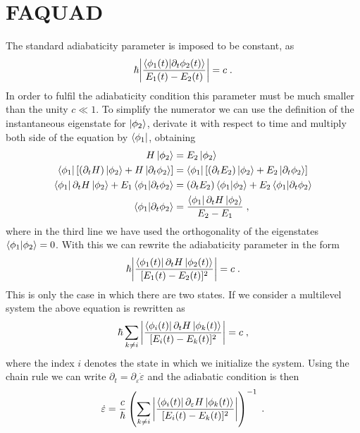 \documentclass[a4paper,11pt]{article}
\begin{document}
\section{FAQUAD}
The standard adiabaticity parameter is imposed to be constant, as
\begin{equation}
	\hbar\abs{\frac{\braket{\phi_1(t)}{\partial_t\phi_2(t)}}{E_1(t)-E_2(t)}}=c\; .
	\label{eq:adiabatic_parameter}
\end{equation}
In order to fulfil the adiabaticity condition this parameter must be much smaller than the unity $c\ll 1$. To simplify the numerator we can use the definition of the instantaneous eigenstate for $\ket{\phi_2}$, derivate it with respect to time and multiply both side of the equation by $\bra{\phi_1}$, obtaining
\begin{equation}
	\begin{split}
	H\ket{\phi_2}&=E_2\ket{\phi_2}\\
	\bra{\phi_1}[(\partial_t H)\ket{\phi_2}+H\ket{\partial_t\phi_2}]&=\bra{\phi_1}[(\partial_t E_2)\ket{\phi_2}+E_2\ket{\partial_t\phi_2}]\\
	\bra{\phi_1}\partial_t H\ket{\phi_2}+E_1\braket{\phi_1}{\partial_t\phi_2}&=(\partial_t E_2)\braket{\phi_1}{\phi_2}+E_2\braket{\phi_1}{\partial_t\phi_2}\\
	\braket{\phi_1}{\partial_t\phi_2}&=\frac{\bra{\phi_1}\partial_t H\ket{\phi_2}}{E_2-E_1}\; ,
	\end{split}
\end{equation}
where in the third line we have used the orthogonality of the eigenstates $\braket{\phi_1}{\phi_2}=0$. With this we can rewrite the adiabaticity parameter in the form
\begin{equation}
\hbar\abs{\frac{\bra{\phi_1(t)}\partial_t H\ket{\phi_2(t)}}{[E_1(t)-E_2(t)]^2}}=c\; .
\end{equation}
This is only the case in which there are two states. If we consider a multilevel system the above equation is rewritten as
\begin{equation}
	\hbar \sum _{k\neq i}\abs{\frac{\bra{\phi_i(t)}\partial_t H\ket{\phi_k(t)}}{[E_i(t)-E_k(t)]^2}}=c\; ,
\end{equation}
where the index $i$ denotes the state in which we initialize the system. Using the chain rule we can write $\partial_t=\partial_\varepsilon \dot{\varepsilon}$ and the adiabatic condition is then
\begin{equation}
	\dot{\varepsilon}=\frac{c}{\hbar}\left(\sum _{k\neq i}\abs{\frac{\bra{\phi_i(t)}\partial_\varepsilon H\ket{\phi_k(t)}}{[E_i(t)-E_k(t)]^2}}\right)^{-1}\; .
	\label{eq:detuning_EDO}
\end{equation}
\end{document}
